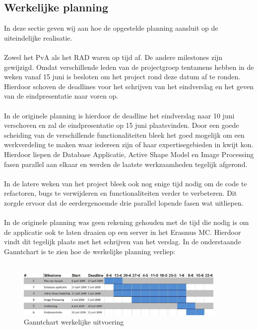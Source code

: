 \subsection{Werkelijke planning}
\label{werkelijke_planning}
In deze sectie geven wij aan hoe de opgestelde planning aansluit op de
uiteindelijke realisatie.
\\
\\
Zowel het PvA als het RAD waren op tijd af. De andere milestones zijn
gewijzigd. Omdat verschillende leden van de projectgroep tentamens
hebben in de weken vanaf 15 juni is besloten om het project rond deze datum af
te ronden. Hierdoor schoven de deadlines voor het schrijven van het eindverslag
en het geven van de eindpresentatie naar voren op.
\\
\\
In de originele planning is hierdoor de deadline het eindverslag naar 10 juni verschoven en zal de eindpresentatie op 15 juni plaatsvinden.
Door een goede scheiding van de verschillende functionaliteiten bleek het goed mogelijk om een werkverdeling te maken waar iedereen zijn of haar expertisegebieden in kwijt kon.
Hierdoor liepen de Database Applicatie, Active Shape Model en Image Processing fasen parallel aan elkaar en werden de laatste werkzaamheden tegelijk afgerond.
\\
\\
In de latere weken van het project bleek ook nog enige tijd nodig om de code te
refactoren, bugs te verwijderen en functionaliteiten verder te verbeteren. Dit
zorgde ervoor dat de eerdergenoemde drie parallel lopende fasen wat uitliepen.
\\
\\
In de originele planning was geen rekening gehouden met de tijd die nodig is om
de applicatie ook te laten draaien op een server in het Erasmus MC. Hierdoor
vindt dit tegelijk plaats met het schrijven van het verslag.
In de onderstaande Ganntchart is te zien hoe de werkelijke planning verliep:
\\
\\
\begin{figure}[ht]
\includegraphics[width=0.9\textwidth]{ganntafter}
\caption{Ganntchart werkelijke uitvoering}
\label{fig:ganntafter}
\end{figure}
